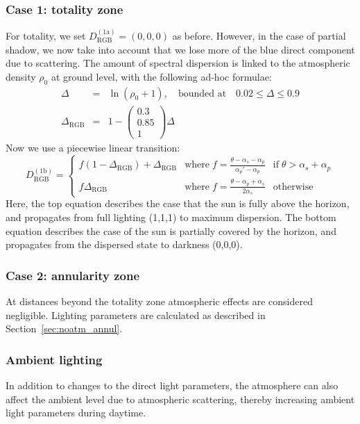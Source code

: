 \documentclass[a4paper]{article}
\begin{document}
\subsubsection{Case 1: totality zone}
For totality, we set $D_\text{RGB}^{(\text{1a})} = (0,0,0)$ as before.
However, in the case of partial shadow, we now take into account that we lose more of the blue direct component due to scattering. The amount of spectral dispersion is linked to the atmospheric density $\rho_0$ at ground level, with the following ad-hoc formulae:
\begin{eqnarray}
\Delta &=& \ln (\rho_0+1),\quad\text{bounded at}\quad 0.02 \leq \Delta \leq 0.9\\
\Delta_\text{RGB} &=& 1-\left(
\begin{array}{c} 0.3 \\ 0.85 \\ 1 \end{array}
\right) \Delta
\end{eqnarray}
Now we use a piecewise linear transition:
\begin{equation}
D_\text{RGB}^{(\text{1b})} = \left\lbrace
\begin{array}{cll}
f (1-\Delta_\text{RGB}) + \Delta_\text{RGB} &\text{where}\; f = \frac{\theta-\alpha_s-\alpha_p}{\alpha_p'-\alpha_p} &\text{if}\; \theta > \alpha_s+\alpha_p \\
f \Delta_\text{RGB} & \text{where}\;f = \frac{\theta-\alpha_p+\alpha_s}{2\alpha_s} &\text{otherwise}
\end{array}
\right.
\end{equation}
Here, the top equation describes the case that the sun is fully above the horizon, and propagates from full lighting (1,1,1) to maximum dispersion. The bottom equation describes the case of the sun is partially covered by the horizon, and propagates from the dispersed state to darkness (0,0,0).

\subsubsection{Case 2: annularity zone}
At distances beyond the totality zone atmospheric effects are considered negligible. Lighting parameters are calculated as described in Section~\ref{sec:noatm_annul}.

\subsubsection{Ambient lighting}
In addition to changes to the direct light parameters, the atmosphere can also affect the ambient level due to atmospheric scattering, thereby increasing ambient light parameters during daytime.
\end{document}
